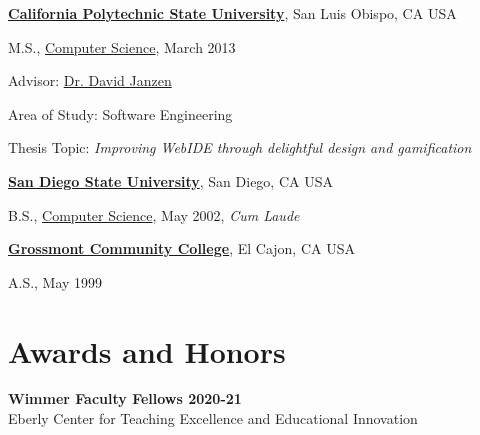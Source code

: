 \documentclass[10pt]{article}
\begin{document}
        
\href{http://www.calpoly.edu/}{\textbf{California Polytechnic State University}},
San Luis Obispo, CA USA

\begin{outerlist}

\item[] M.S.,
		\vspace{-.2\baselineskip}
        \href{https://www.csc.calpoly.edu/}
             {Computer Science}, March 2013
              \begin{innerlist}
             \item Advisor:
              \href{https://users.csc.calpoly.edu/~djanzen/}
                   {Dr. David Janzen} 
        \item Area of Study: Software Engineering 
        \item Thesis Topic: \emph{Improving WebIDE through delightful design and gamification}
        \end{innerlist}
              
\end{outerlist}
\vspace{.5\baselineskip}

\href{https://www.sdsu.edu/}{\textbf{San Diego State University}},
San Diego, CA USA
\begin{outerlist}

\item[] B.S.,
        \href{https://www.cs.sdsu.edu/}
             {Computer Science}, May 2002, \emph{Cum Laude}
\end{outerlist}
\vspace{.5\baselineskip}


\href{http://www.grossmont.edu/}{\textbf{Grossmont Community College}},
El Cajon, CA USA

\begin{outerlist}

\item[] A.S.,
             May 1999
\end{outerlist}

\section{Awards and Honors}


\textbf{Wimmer Faculty Fellows 2020-21}\\
Eberly Center for Teaching Excellence and Educational Innovation
\end{document}

